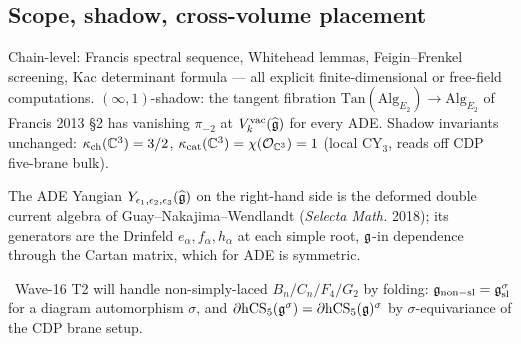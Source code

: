 \subsection{Scope, shadow, cross-volume placement}

Chain-level: Francis spectral sequence, Whitehead lemmas,
Feigin--Frenkel screening, Kac determinant formula --- all explicit
finite-dimensional or free-field computations. $(\infty,1)$-shadow:
the tangent fibration $\mathrm{Tan}(\mathrm{Alg}_{E_2})\to
\mathrm{Alg}_{E_2}$ of Francis 2013 \S2 has vanishing $\pi_{-2}$ at
$V^{\mathrm{vac}}_{k}(\widehat{\mathfrak{g}})$ for every ADE. Shadow invariants unchanged:
$\kappa_{\mathrm{ch}}(\mathbb{C}^3)=3/2$, $\kappa_{\mathrm{cat}}(\mathbb{C}^3)=\chi(\mathcal{O}_{\mathbb{C}^3})=1$ (local CY$_3$,
reads off CDP five-brane bulk).

The ADE Yangian $Y_{\epsilon_1,\epsilon_2,\epsilon_3}(\widehat{\mathfrak{g}})$ on the right-hand side is the
deformed double current algebra of Guay--Nakajima--Wendlandt
(\emph{Selecta Math.} 2018); its generators are the Drinfeld
$e_{\alpha},f_{\alpha},h_\alpha$ at each simple root, $\mathfrak{g}$-in
dependence through the Cartan matrix, which for ADE is symmetric.

\ClaimStatusConjectured\ Wave-16 T2 will handle non-simply-laced
$B_n/C_n/F_4/G_2$ by folding: $\mathfrak{g}_{\mathrm{non-sl}}=
\mathfrak{g}_{\mathrm{sl}}^{\sigma}$ for a diagram automorphism $\sigma$,
and $\partial\mathrm{hCS}_5(\mathfrak{g}^\sigma)=\partial\mathrm{hCS}_5(\mathfrak{g})^{\sigma}$
by $\sigma$-equivariance of the CDP brane setup.
